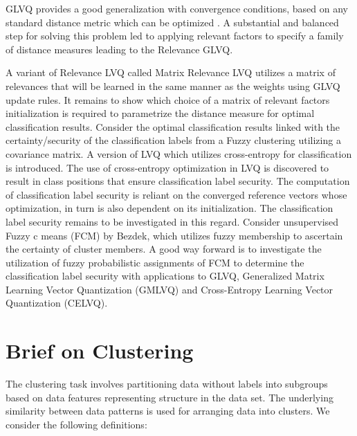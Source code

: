 \documentclass[english]{HSMW-Thesis}
\begin{document}
GLVQ provides a good generalization with convergence conditions, based on any standard distance metric which can be optimized \cite{hammer2005generalization}. A substantial and balanced step for solving this problem led to applying relevant factors to specify a family of distance measures leading to the  Relevance GLVQ\cite{hammer2002generalized}.

A variant of Relevance LVQ  called Matrix Relevance LVQ utilizes a matrix of relevances that will be learned in the same manner as the weights using GLVQ update rules\cite{schneider2009adaptive}. 
It remains to show which choice of a matrix of relevant factors initialization is required to parametrize the distance measure for optimal classification results\cite{hammer2002generalized,bunte2012limited}. Consider the optimal classification results linked with the certainty/security of the classification labels from a Fuzzy clustering utilizing a covariance matrix\cite{gath1989unsupervised}. A version of LVQ which utilizes cross-entropy for classification is introduced\cite{villmann2018probabilistic,kaden2014aspects}. The use of cross-entropy optimization in LVQ is discovered to result in class positions that ensure classification label security\cite{villmann2018probabilistic}. The computation of classification label security is reliant on the converged reference vectors\cite{bezdek1981pattern} whose optimization, in turn is also dependent on its initialization\cite{boubezoul2008application}.
The classification label security remains to be investigated in this regard.
Consider unsupervised Fuzzy c means (FCM) by Bezdek, which utilizes fuzzy membership to ascertain the certainty of cluster members\cite{bezdek1981pattern}. A good way forward is to investigate the utilization of fuzzy probabilistic assignments of FCM to determine the classification label security with applications to GLVQ, Generalized Matrix Learning Vector Quantization (GMLVQ) and Cross-Entropy Learning Vector Quantization (CELVQ).

\section{Brief on Clustering}
The clustering task involves partitioning data without labels into subgroups based on data features representing structure in the data set. The underlying similarity between data patterns is used for arranging data into clusters. We consider the following definitions:
\end{document}

